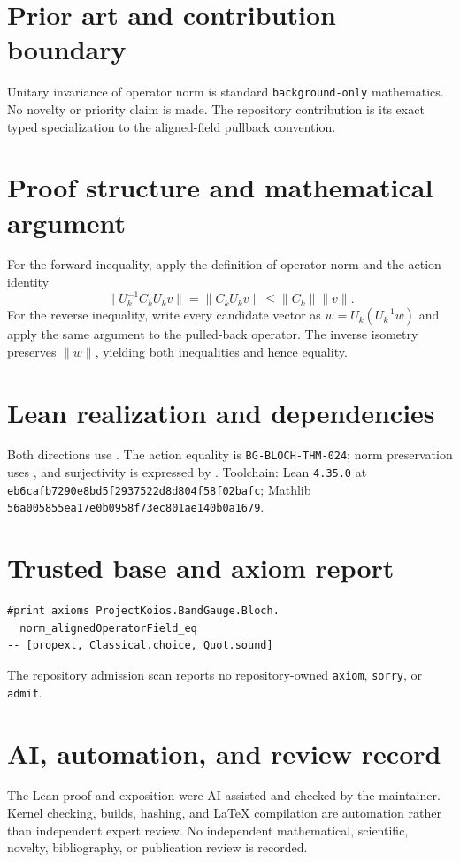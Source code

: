 \documentclass[11pt]{article}
\begin{document}
\section{Prior art and contribution boundary}
Unitary invariance of operator norm is standard \texttt{background-only} mathematics.  No novelty or priority claim is made.  The repository contribution is its exact typed specialization to the aligned-field pullback convention.

\section{Proof structure and mathematical argument}
For the forward inequality, apply the definition of operator norm and the action identity
\[
 \lVert U_k^{-1}C_kU_kv\rVert=\lVert C_kU_kv\rVert
 \leq\lVert C_k\rVert\lVert v\rVert.
\]
For the reverse inequality, write every candidate vector as $w=U_k(U_k^{-1}w)$ and apply the same argument to the pulled-back operator.  The inverse isometry preserves $\lVert w\rVert$, yielding both inequalities and hence equality.

\section{Lean realization and dependencies}
Both directions use .  The action equality is \texttt{BG-BLOCH-THM-024}; norm preservation uses , and surjectivity is expressed by .  Toolchain: Lean \texttt{4.35.0} at \texttt{eb6cafb7290e8bd5f2937522d8d804f58f02bafc}; Mathlib \texttt{56a005855ea17e0b0958f73ec801ae140b0a1679}.

\section{Trusted base and axiom report}
\begin{verbatim}
#print axioms ProjectKoios.BandGauge.Bloch.
  norm_alignedOperatorField_eq
-- [propext, Classical.choice, Quot.sound]
\end{verbatim}
The repository admission scan reports no repository-owned \texttt{axiom}, \texttt{sorry}, or \texttt{admit}.

\section{AI, automation, and review record}
The Lean proof and exposition were AI-assisted and checked by the maintainer.  Kernel checking, builds, hashing, and LaTeX compilation are automation rather than independent expert review.  No independent mathematical, scientific, novelty, bibliography, or publication review is recorded.
\end{document}
